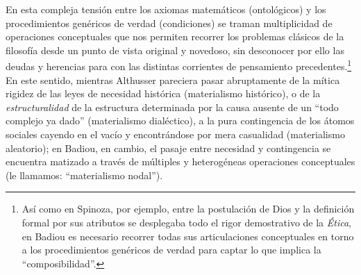 En esta compleja tensión entre los axiomas matemáticos (ontológicos) y los procedimientos genéricos de verdad (condiciones) se traman multiplicidad de operaciones conceptuales que nos permiten recorrer los problemas clásicos de la filosofía desde un punto de vista original y novedoso, sin desconocer por ello las deudas y herencias para con las distintas corrientes de pensamiento precedentes.\footnote{Así como en Spinoza, por ejemplo, entre la postulación de Dios y la definición formal por sus atributos se desplegaba todo el rigor demostrativo de la \emph{Ética}, en Badiou es necesario recorrer todas sus articulaciones conceptuales en torno a los procedimientos genéricos de verdad para captar lo que implica la \enquote{composibilidad}.} En este sentido, mientras Althusser pareciera pasar abruptamente de la mítica rigidez de las leyes de necesidad histórica (materialismo histórico), o de la \emph{estructuralidad} de la estructura determinada por la causa ausente de un \enquote{todo complejo ya dado} (materialismo dialéctico), a la pura contingencia de los átomos sociales cayendo en el vacío y encontrándose por mera casualidad (materialismo aleatorio); en Badiou, en cambio, el pasaje entre necesidad y contingencia se encuentra matizado a través de múltiples y heterogéneas operaciones conceptuales (le llamamos: \enquote{materialismo nodal}).

